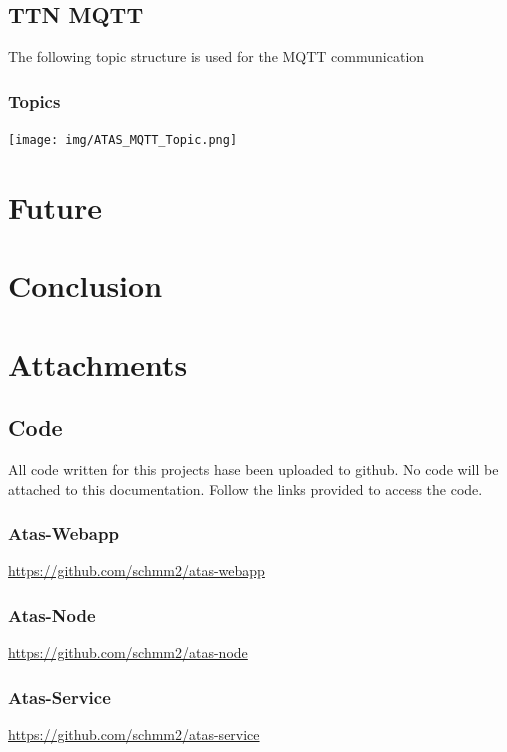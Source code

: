 \documentclass[a4paper,11pt, oneside]{report}
\theoremstyle{definition}
\begin{document}
\section{TTN MQTT}
The following topic structure is used for the MQTT communication
\subsection{Topics}
\texttt{[image: img/ATAS\_MQTT\_Topic.png]}\\[1cm]    

\chapter{Future}

\chapter{Conclusion}

\chapter{Attachments}
\section{Code}
All code written for this projects hase been uploaded to github. No code will be attached to this documentation. Follow the links provided to access the code.
\subsection{Atas-Webapp}
\url{https://github.com/schmm2/atas-webapp}
\subsection{Atas-Node}
\url{https://github.com/schmm2/atas-node}
\subsection{Atas-Service}
\url{https://github.com/schmm2/atas-service}


\printglossaries
\end{document}
